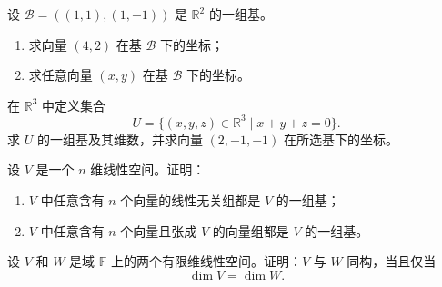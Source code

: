 \begin{exercise}
    \label{exer_vector_15}
    设 \(\mathcal B=((1,1),(1,-1))\) 是 \(\mathbb R^2\) 的一组基。
    \begin{enumerate}
        \item 求向量 \((4,2)\) 在基 \(\mathcal B\) 下的坐标；
        \item 求任意向量 \((x,y)\) 在基 \(\mathcal B\) 下的坐标。
    \end{enumerate}
\end{exercise}

\begin{exercise}
    \label{exer_vector_16}
    在 \(\mathbb R^3\) 中定义集合
    \[
        U=\{(x,y,z)\in\mathbb R^3\mid x+y+z=0\}.
    \]
    求 \(U\) 的一组基及其维数，并求向量 \((2,-1,-1)\) 在所选基下的坐标。
\end{exercise}

\begin{exercise}
    \label{exer_vector_17}
    设 \(V\) 是一个 \(n\) 维线性空间。证明：
    \begin{enumerate}
        \item \(V\) 中任意含有 \(n\) 个向量的线性无关组都是 \(V\) 的一组基；
        \item \(V\) 中任意含有 \(n\) 个向量且张成 \(V\) 的向量组都是 \(V\) 的一组基。
    \end{enumerate}
\end{exercise}

\begin{exercise}
    \label{exer_vector_18}
    设 \(V\) 和 \(W\) 是域 \(\mathbb F\) 上的两个有限维线性空间。证明：\(V\) 与 \(W\) 同构，当且仅当
    \[
        \dim V=\dim W.
    \]
\end{exercise}
